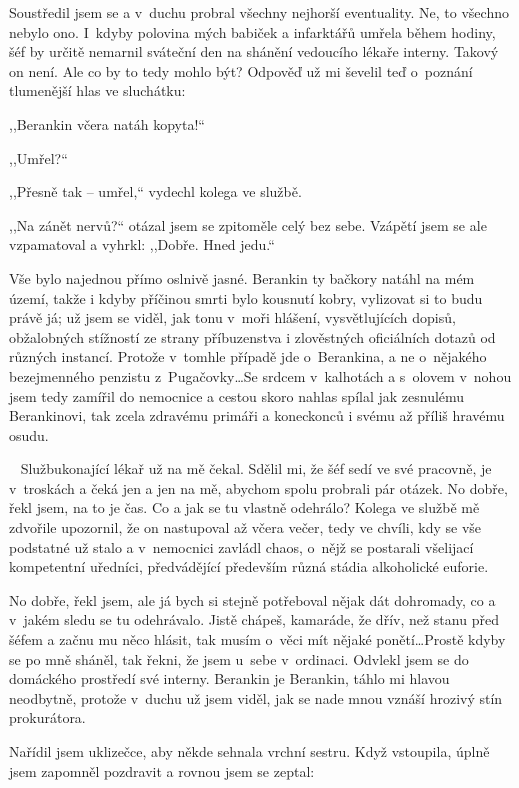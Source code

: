 Soustředil jsem se a v~duchu probral všechny nejhorší eventuality. Ne, to všechno nebylo ono. I~kdyby polovina mých babiček a infarktářů umřela během hodiny, šéf by určitě nemarnil sváteční den na shánění vedoucího lékaře interny. Takový on není. Ale co by to tedy mohlo být? Odpověď už mi ševelil teď o~poznání tlumenější hlas ve sluchátku:

,,Berankin včera natáh kopyta!“

,,Umřel?“

,,Přesně tak – umřel,“ vydechl kolega ve službě.

,,Na zánět nervů?“ otázal jsem se zpitoměle celý bez sebe. Vzápětí jsem se ale vzpamatoval a vyhrkl: ,,Dobře. Hned jedu.“

Vše bylo najednou přímo oslnivě jasné. Berankin ty bačkory natáhl na mém území, takže i kdyby příčinou smrti bylo kousnutí kobry, vylizovat si to budu právě já; už jsem se viděl, jak tonu v~moři hlášení, vysvětlujících dopisů, obžalobných stížností ze strany příbuzenstva i zlověstných oficiálních dotazů od různých instancí. Protože v~tomhle případě jde o~Berankina, a ne o~nějakého bezejmenného penzistu z~Pugačovky\ldots Se srdcem v~kalhotách a s~olovem v~nohou jsem tedy zamířil do nemocnice a cestou skoro nahlas spílal jak zesnulému Berankinovi, tak zcela zdravému primáři a koneckonců i svému až příliš hravému osudu.

Službukonající lékař už na mě čekal. Sdělil mi, že šéf sedí ve své pracovně, je v~troskách a čeká jen a jen na mě, abychom spolu probrali pár otázek. No dobře, řekl jsem, na to je čas. Co a jak se tu vlastně odehrálo? Kolega ve službě mě zdvořile upozornil, že on nastupoval až včera večer, tedy ve chvíli, kdy se vše podstatné už stalo a v~nemocnici zavládl chaos, o~nějž se postarali všelijací kompetentní uředníci, předvádějící především různá stádia alkoholické euforie.

No dobře, řekl jsem, ale já bych si stejně potřeboval nějak dát dohromady, co a v~jakém sledu se tu odehrávalo. Jistě chápeš, kamaráde, že dřív, než stanu před šéfem a začnu mu něco hlásit, tak musím o~věci mít nějaké ponětí\ldots Prostě kdyby se po mně sháněl, tak řekni, že jsem u~sebe v~ordinaci. Odvlekl jsem se do domáckého prostředí své interny. Berankin je Berankin, táhlo mi hlavou neodbytně, protože v~duchu už jsem viděl, jak se nade mnou vznáší hrozivý stín prokurátora.

Nařídil jsem uklizečce, aby někde sehnala vrchní sestru. Když vstoupila, úplně jsem zapomněl pozdravit a rovnou jsem se zeptal:

